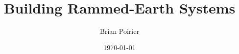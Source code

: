 \documentclass{article}
\begin{document}
\title{Building Rammed-Earth Systems}
\author{Brian Poirier}
\date{\today}
\maketitle
\clearpage

\tableofcontents
\clearpage



\clearpage


\clearpage


\clearpage


\clearpage

\printbibliography
\end{document}
